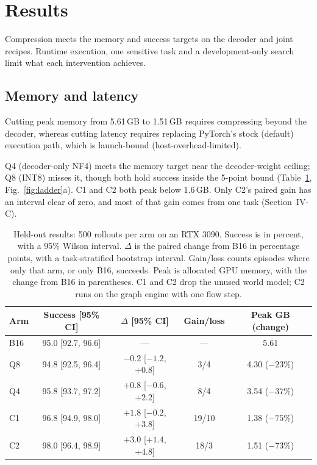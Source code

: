 \documentclass[conference]{IEEEtran}
\begin{document}
\section{Results}
Compression meets the memory and success targets on the decoder and joint recipes. Runtime execution, one sensitive task and a development-only search limit what each intervention achieves.

\subsection{Memory and latency}
Cutting peak memory from 5.61\,GB to 1.51\,GB requires compressing beyond the decoder, whereas cutting latency requires replacing PyTorch's stock (default) execution path, which is launch-bound (host-overhead-limited).

Q4 (decoder-only NF4) meets the memory target near the decoder-weight ceiling; Q8 (INT8) misses it, though both hold success inside the 5-point bound (Table~\ref{tab:results}, Fig.~\ref{fig:ladder}a). C1 and C2 both peak below 1.6\,GB. Only C2's paired gain has an interval clear of zero, and most of that gain comes from one task (Section~IV-C).

\begin{table}[t]
\centering\footnotesize\setlength{\tabcolsep}{2pt}
\caption{Held-out results: 500 rollouts per arm on an RTX 3090. Success is in percent, with a 95\% Wilson interval. $\Delta$ is the paired change from B16 in percentage points, with a task-stratified bootstrap interval. Gain/loss counts episodes where only that arm, or only B16, succeeds. Peak is allocated GPU memory, with the change from B16 in parentheses. C1 and C2 drop the unused world model; C2 runs on the graph engine with one flow step.}
\label{tab:results}
\begin{tabular}{@{}lcccc@{}}
\toprule
Arm & Success [95\% CI] & $\Delta$ [95\% CI] & Gain/loss & Peak GB (change) \\
\midrule
B16 & 95.0 [92.7, 96.6] & --- & --- & 5.61 \\
Q8 & 94.8 [92.5, 96.4] & $-0.2$ [$-1.2$, $+0.8$] & 3/4 & 4.30 ($-23$\%) \\
Q4 & 95.8 [93.7, 97.2] & $+0.8$ [$-0.6$, $+2.2$] & 8/4 & 3.54 ($-37$\%) \\
C1 & 96.8 [94.9, 98.0] & $+1.8$ [$-0.2$, $+3.8$] & 19/10 & 1.38 ($-75$\%) \\
C2 & 98.0 [96.4, 98.9] & $+3.0$ [$+1.4$, $+4.8$] & 18/3 & 1.51 ($-73$\%) \\
\bottomrule
\end{tabular}
\end{table}
\end{document}
